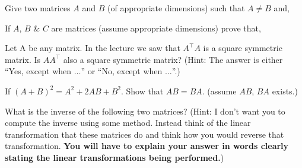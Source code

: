 \documentclass[solution,addpoints,12pt]{exam}
\begin{document}
\begin{questions}
\question[1]
Give two matrices $A$ and $B$ (of appropriate dimensions) such that $A \neq B$ and, 



\question 
If $A$, $B$ \& $C$ are matrices (assume appropriate dimensions) prove that, 

\question[1] Let A be any matrix. In the lecture we saw that $A^\top A$ is a square symmetric matrix. Is  $AA^\top$ also a square symmetric matrix? (Hint: The answer is either ``Yes, except when $\dots$'' or  ``No, except when $\dots$''.)

\question[1]
If $(A+B)^{2} = A^{2} + 2AB + B^{2}$. Show that $AB=BA$. (assume $AB$, $BA$ exists.)
\begin{solution}
\end{solution}

\question What is the inverse of the following two matrices? (Hint: I don't want you to compute the inverse using some method. Instead think of the linear transformation that these matrices do and think how you would reverse that transformation. \textbf{You will have to explain your answer in words clearly stating the linear transformations being performed.}) \\
\begin{parts}

\end{parts}
\end{questions}
\end{document}
